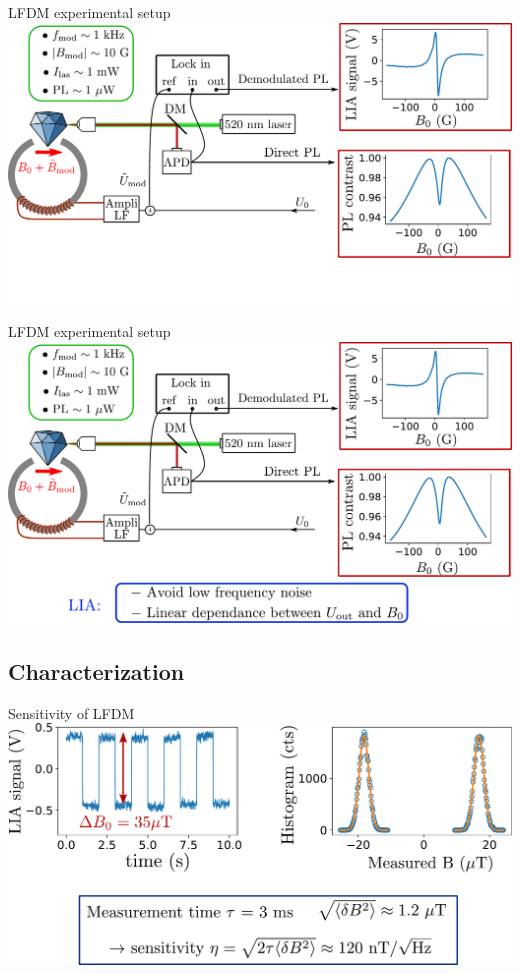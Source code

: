 \documentclass{beamer}
\begin{document}
\begin{frame}{LFDM experimental setup}
\centering
\includegraphics[width=\textwidth,height=0.85\textheight,keepaspectratio]{Slide_principle_LFDM_f-1}
\end{frame}

\begin{frame}{LFDM experimental setup}
\centering
\includegraphics[width=\textwidth,height=0.85\textheight,keepaspectratio]{Slide_principle_LFDM_f}
\end{frame}

\subsection{Characterization}
\begin{frame}{Sensitivity of LFDM}
\centering
\includegraphics[width=\textwidth,height=0.85\textheight,keepaspectratio]{Slide_sensi_LFDM}
\end{frame}
\end{document}
